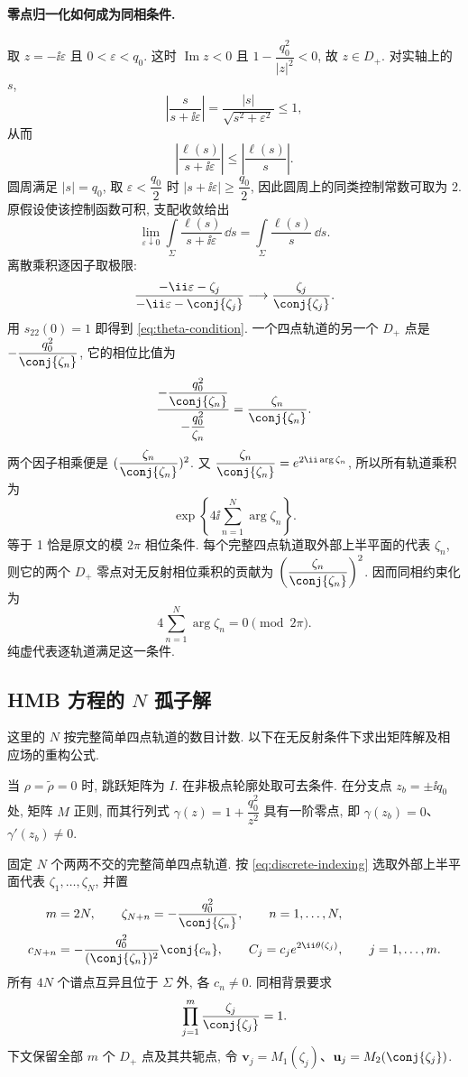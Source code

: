 \paragraph{零点归一化如何成为同相条件.}
取 $z=-\ii\varepsilon$ 且 $0<\varepsilon<q_0$.
这时 $\operatorname{Im}z<0$ 且 $1-\dfrac{q_0^2}{|z|^2}<0$,
故 $z\in D_+$.
对实轴上的 $s$,
\[
\left|\dfrac{s}{s+\ii\varepsilon}\right|
=\dfrac{|s|}{\sqrt{s^2+\varepsilon^2}}\le1,
\]
从而
\[
\left|\dfrac{\ell(s)}{s+\ii\varepsilon}\right|
\le\left|\dfrac{\ell(s)}{s}\right|.
\]
圆周满足 $|s|=q_0$, 取 $\varepsilon<\dfrac{q_0}{2}$ 时
$|s+\ii\varepsilon|\ge\dfrac{q_0}{2}$,
因此圆周上的同类控制常数可取为 2.
原假设使该控制函数可积, 支配收敛给出
\[
\lim\limits_{\varepsilon\downarrow0}
\int\limits_\Sigma\dfrac{\ell(s)}{s+\ii\varepsilon}\,\dd s
=\int\limits_\Sigma\dfrac{\ell(s)}{s}\,\dd s.
\]
离散乘积逐因子取极限:
\[
\dfrac{-\ii\varepsilon-\zeta_j}
{-\ii\varepsilon-\conj{\zeta_j}}
\longrightarrow\dfrac{\zeta_j}{\conj{\zeta_j}}.
\]
用 $s_{22}(0)=1$ 即得到 \eqref{eq:theta-condition}.
一个四点轨道的另一个 $D_+$ 点是
$-\dfrac{q_0^2}{\conj{\zeta_n}}$, 它的相位比值为
\[
\dfrac{-\dfrac{q_0^2}{\conj{\zeta_n}}}{-\dfrac{q_0^2}{\zeta_n}}
=\dfrac{\zeta_n}{\conj{\zeta_n}}.
\]
两个因子相乘便是 $(\dfrac{\zeta_n}{\conj{\zeta_n}})^2$.
又 $\dfrac{\zeta_n}{\conj{\zeta_n}}=e^{2\ii\arg\zeta_n}$,
所以所有轨道乘积为
\[
\exp\left\{4\ii\sum\limits_{n=1}^{N}\arg\zeta_n\right\}.
\]
等于 1 恰是原文的模 $2\pi$ 相位条件.
每个完整四点轨道取外部上半平面的代表 $\zeta_n$, 则它的两个 $D_+$ 零点对无反射相位乘积的贡献为 $\left(\dfrac{\zeta_n}{\conj{\zeta_n}}\right)^2$. 因而同相约束化为
\[
4\sum\limits_{n=1}^{N}\arg\zeta_n=0\pmod{2\pi}.
\]
纯虚代表逐轨道满足这一条件.

\subsection{HMB 方程的 \texorpdfstring{$N$}{N} 孤子解}
这里的 $N$ 按完整简单四点轨道的数目计数. 以下在无反射条件下求出矩阵解及相应场的重构公式.

当 $\rho=\widetilde\rho=0$ 时, 跳跃矩阵为 $I$. 在非极点轮廓处取可去条件. 在分支点 $z_b=\pm\ii q_0$ 处, 矩阵 $M$ 正则, 而其行列式 $\gamma(z)=1+\dfrac{q_0^2}{z^2}$ 具有一阶零点, 即 $\gamma(z_b)=0$、$\gamma'(z_b)\ne0$.

固定 $N$ 个两两不交的完整简单四点轨道. 按 \eqref{eq:discrete-indexing} 选取外部上半平面代表 $\zeta_1,\ldots,\zeta_N$, 并置
\begin{equation}\label{eq:N-orbit-data}
\begin{aligned}
m&=2N,\qquad \zeta_{N+n}=-\dfrac{q_0^2}{\conj{\zeta_n}},\qquad n=1,\ldots,N,\\
c_{N+n}&=-\dfrac{q_0^2}{(\conj{\zeta_n})^2}\conj{c_n},\qquad
C_j=c_je^{2\ii\theta(\zeta_j)},\qquad j=1,\ldots,m.
\end{aligned}
\end{equation}
所有 $4N$ 个谱点互异且位于 $\Sigma$ 外, 各 $c_n\ne0$. 同相背景要求
\begin{equation}\label{eq:N-orbit-phase}
\prod\limits_{j=1}^{m}\dfrac{\zeta_j}{\conj{\zeta_j}}=1.
\end{equation}
下文保留全部 $m$ 个 $D_+$ 点及其共轭点, 令 $\mathbf v_j=M_1(\zeta_j)$、$\mathbf u_j=M_2(\conj{\zeta_j})$.

